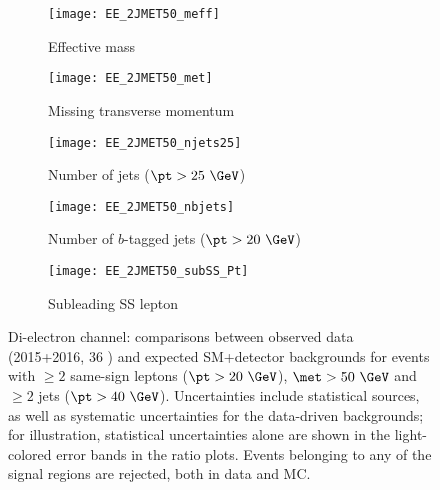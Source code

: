 
\begin{figure}[t!]
\centering
\begin{subfigure}[t]{0.48\textwidth}
\texttt{[image: EE\_2JMET50\_meff]}
\caption{Effective mass \meff}
\end{subfigure}
\begin{subfigure}[t]{0.48\textwidth}
\texttt{[image: EE\_2JMET50\_met]}
\caption{Missing transverse momentum \met}
\end{subfigure}
\begin{subfigure}[t]{0.48\textwidth}
\texttt{[image: EE\_2JMET50\_njets25]}
\caption{Number of jets ($\pt>25~\GeV$)}
\end{subfigure}
\begin{subfigure}[t]{0.48\textwidth}
\texttt{[image: EE\_2JMET50\_nbjets]}
\caption{Number of $b$-tagged jets ($\pt>20~\GeV$)}
\end{subfigure}
\begin{subfigure}[t]{0.48\textwidth}
\texttt{[image: EE\_2JMET50\_subSS\_Pt]}
\caption{Subleading SS lepton \pt}
\end{subfigure}
\caption{Di-electron channel: comparisons between observed data (2015+2016, 36 \ifb) and expected SM+detector backgrounds 
for events with $\ge 2$ same-sign leptons ($\pt>20~\GeV$), $\met>50~\GeV$ and $\ge 2$ jets ($\pt>40~\GeV$). 
Uncertainties include statistical sources, as well as systematic uncertainties for the data-driven backgrounds; 
for illustration, statistical uncertainties alone are shown in the light-colored error bands in the ratio plots. 
Events belonging to any of the signal regions are rejected, both in data and MC. 
}
\label{fig:distributions_channelEE_2015}
\end{figure} 

